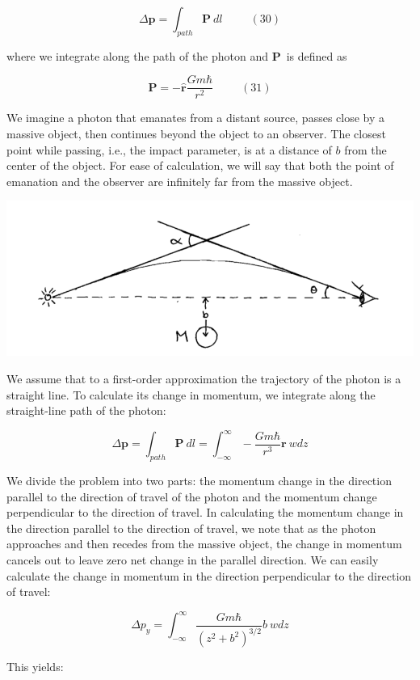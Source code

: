 \documentclass {article}
\renewcommand\vec{\mathbf}
\let\OldHat\hat
\renewcommand{\hat}[1]{\OldHat{\mathbf{#1}}}
\begin{document}
$$\Delta \vec p = \int_{path} \vec P ~ dl ~~~~~~~~~~~ (30)$$

where we integrate along the path of the photon and $\vec P$ is defined as

$$\vec P = - \hat r \frac {Gm\hbar}{r^2} ~~~~~~~~~~~ (31)$$

We imagine a photon that emanates from a distant source, passes close by a massive object, then continues beyond the object to an observer. The closest point while passing, i.e., the impact parameter, is at a distance of $b$ from the center of the object. For ease of calculation, we will say that both the point of emanation and the observer are infinitely far from the massive object.

\begin{center}
	\includegraphics[scale=0.4]{light-bending.png}
\end{center}


We assume that to a first-order approximation the trajectory of the photon is a straight line. To calculate its change in momentum, we integrate along the straight-line path of the photon:

$$\Delta \vec p = \int_{path} \vec P ~ dl = \int_{-\infty}^{\infty} - \frac {Gm\hbar}{r^3} \vec r ~ wdz $$

We divide the problem into two parts: the momentum change in the direction parallel to the direction of travel of the photon and the momentum change perpendicular to the direction of travel. In calculating the momentum change in the direction parallel to the direction of travel, we note that as the photon approaches and then recedes from the massive object, the change in momentum cancels out to leave zero net change in the parallel direction. We can easily calculate the change in momentum in the direction perpendicular to the direction of travel:

$$\Delta p_y = \int_{-\infty}^{\infty}  \frac {Gm\hbar}{(z^2 + b^2)^{3/2}} b ~ wdz $$

This yields:
\end{document}
